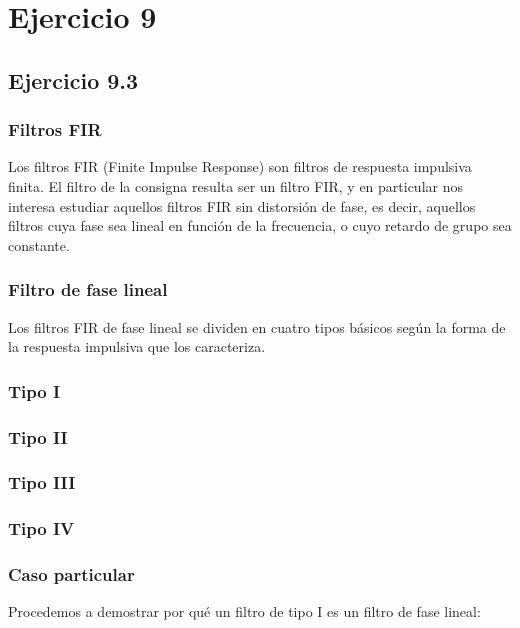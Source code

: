 
	\chapter{Ejercicio 9}
	\section{Ejercicio 9.3}
	\subsection{Filtros FIR}
	Los filtros FIR (Finite Impulse Response) son filtros de respuesta impulsiva finita. El filtro de la consigna resulta ser un filtro FIR, y en particular nos interesa estudiar aquellos filtros FIR sin distorsión de fase, es decir, aquellos filtros cuya fase sea lineal en función de la frecuencia, o cuyo retardo de grupo sea constante. \par
			\subsection{Filtro de fase lineal}
 	Los filtros FIR de fase lineal se dividen en cuatro tipos básicos según la forma de la respuesta impulsiva que los caracteriza. 
 	\subsection{Tipo I}
 	\subsection{Tipo II}
 	\subsection{Tipo III}
 	\subsection{Tipo IV}

	\subsection{Caso particular}
	
		Procedemos a demostrar por qué un filtro de tipo I es un filtro de fase lineal:\par
		

